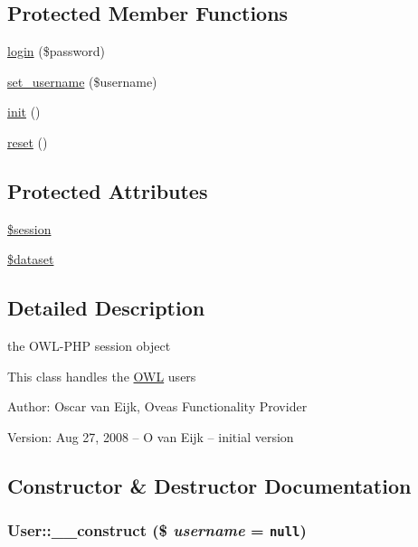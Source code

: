 \subsection*{Protected Member Functions}
\begin{CompactItemize}
\item 
\hyperlink{classUserHandler_7a0b269a54d9430f48d6490c1fe14ecd}{login} (\$password)
\item 
\hyperlink{classUserHandler_fbcc9a275b547cca0bd4cff567b054a0}{set\_\-username} (\$username)
\item 
\hyperlink{class__OWL_e0ef3ded56e8a6b34b6461e5a721cd3e}{init} ()
\item 
\hyperlink{class__OWL_2f2a042bcf31965194c03033df0edc9b}{reset} ()
\end{CompactItemize}
\subsection*{Protected Attributes}
\begin{CompactItemize}
\item 
\hyperlink{classUserHandler_f097b7fd1ee085b46a6c34e071508a7f}{\$session}
\item 
\hyperlink{classUserHandler_c38c1ea50b2820ed03781bdbe8eb2e08}{\$dataset}
\end{CompactItemize}


\subsection{Detailed Description}
the OWL-PHP session object 

This class handles the \hyperlink{classOWL}{OWL} users \begin{Desc}
\item[Author:]Oscar van Eijk, Oveas Functionality Provider \end{Desc}
\begin{Desc}
\item[Version:]Aug 27, 2008 -- O van Eijk -- initial version \end{Desc}


\subsection{Constructor \& Destructor Documentation}
\hypertarget{classUser_b8a717f17626301cc8b7815a43ea5b5b}{
\subsubsection{\setlength{\rightskip}{0pt plus 5cm}User::\_\-\_\-construct (\$ {\em username} = {\tt null})}}
\label{classUser_b8a717f17626301cc8b7815a43ea5b5b}


